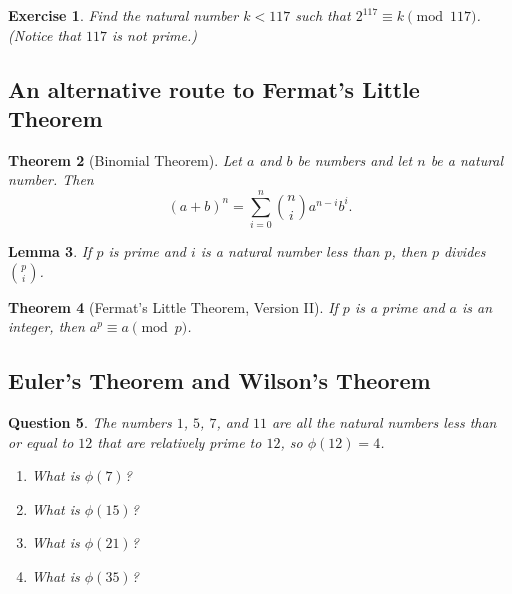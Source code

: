\documentclass[11pt,leqno]{article}
\newtheorem{thm}{Theorem}[section]
\newtheorem{lem}[thm]{Lemma}
\newtheorem{exer}[thm]{Exercise}
\newtheorem{ques}[thm]{Question}
\theoremstyle{definition}
\begin{document}

\begin{exer}
Find the natural number $k < 117$ such that $2^{117} \equiv k
\pmod{117}$. (Notice that $117$ is not prime.)
\end{exer}


\subsection*{An alternative route to Fermat's Little Theorem}

\begin{thm}[Binomial Theorem]
Let $a$ and $b$ be numbers and let $n$ be a natural number.  Then
\[(a+b)^n = \sum_{i=0}^n \binom{n}{i} a^{n-i}b^i.\]
\end{thm}

\begin{lem}
If $p$ is prime and $i$ is a natural number less than $p$, then $p$
divides $\binom{p}{i}$.
\end{lem}


\begin{thm}[Fermat's Little Theorem, Version II]
If $p$ is a prime and $a$ is an integer, then $a^p \equiv a
\pmod{p}$.
\end{thm}



\subsection*{Euler's Theorem and Wilson's Theorem}


\begin{ques}
The numbers $1$, $5$, $7$, and $11$ are all the natural numbers less
than or equal to $12$ that are relatively prime to $12$, so
$\phi(12) = 4$.
\begin{enumerate}
\item What is $\phi(7)$?
\item What is $\phi(15)$?
\item What is $\phi(21)$?
\item What is $\phi(35)$?
\end{enumerate}
\end{ques}
\end{document}
